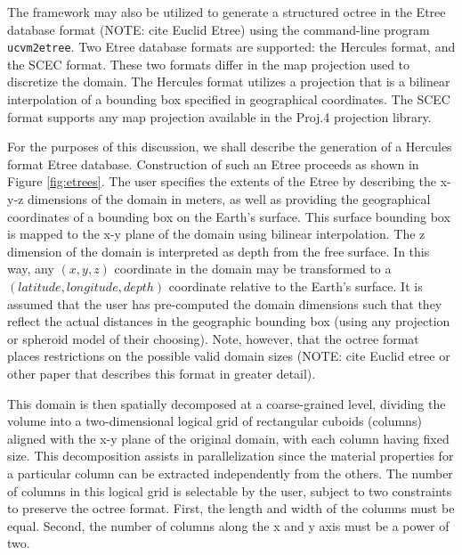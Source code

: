 The framework may also be utilized to generate a structured octree in the Etree database format (NOTE: cite Euclid Etree) using the command-line program \texttt{ucvm2etree}. Two Etree database formats are supported: the Hercules format, and the SCEC format. These two formats differ in the map projection used to discretize the domain. The Hercules format utilizes a projection that is a bilinear interpolation of a bounding box specified in geographical coordinates. The SCEC format supports any map projection available in the Proj.4 projection library.

For the purposes of this discussion, we shall describe the generation of a Hercules format Etree database. Construction of such an Etree proceeds as shown in Figure \ref{fig:etrees}. The user specifies the extents of the Etree by describing the x-y-z dimensions of the domain in meters, as well as providing the geographical coordinates of a bounding box on the Earth's surface. This surface bounding box is mapped to the x-y plane of the domain using bilinear interpolation. The z dimension of the domain is interpreted as depth from the free surface. In this way, any $(x,y,z)$ coordinate in the domain may be transformed to a $(latitude, longitude, depth)$ coordinate relative to the Earth's surface. It is assumed that the user has pre-computed the domain dimensions such that they reflect the actual distances in the geographic bounding box (using any projection or spheroid model of their choosing). Note, however, that the octree format places restrictions on the possible valid domain sizes (NOTE: cite Euclid etree or other paper that describes this format in greater detail).

This domain is then spatially decomposed at a coarse-grained level, dividing the volume into a two-dimensional logical grid of rectangular cuboids (columns) aligned with the x-y plane of the original domain, with each column having fixed size. This decomposition assists in parallelization since the material properties for a particular column can be extracted independently from the others. The number of columns in this logical grid is selectable by the user, subject to two constraints to preserve the octree format. First, the length and width of the columns must be equal. Second, the number of columns along the x and y axis must be a power of two.

